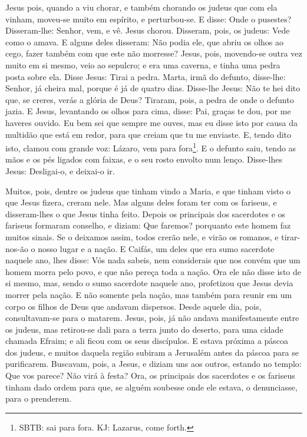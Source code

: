 Jesus pois, quando a viu chorar, e também chorando os judeus que
com ela vinham, moveu-se muito em espírito, e perturbou-se. E
disse: Onde o pusestes? Disseram-lhe: Senhor, vem, e vê.
Jesus chorou. Disseram, pois, os judeus: Vede como o
amava. E alguns deles disseram: Não podia ele, que abriu os
olhos ao cego, fazer também com que este não morresse? Jesus,
pois, movendo-se outra vez muito em si mesmo, veio ao sepulcro; e
era uma caverna, e tinha uma pedra posta sobre ela. Disse
Jesus: Tirai a pedra. Marta, irmã do defunto, disse-lhe: Senhor, já
cheira mal, porque é já de quatro dias. Disse-lhe Jesus: Não
te hei dito que, se creres, verás a glória de Deus? Tiraram,
pois, a pedra de onde o defunto jazia. E Jesus, levantando os olhos
para cima, disse: Pai, graças te dou, por me haveres ouvido.
Eu bem sei que sempre me ouves, mas eu disse isto por causa
da multidão que está em redor, para que creiam que tu me enviaste.
E, tendo dito isto, clamou com grande voz: Lázaro, vem para
fora\footnote{SBTB: sai para fora. KJ: Lazarus, come forth.}.
E o defunto saiu, tendo as mãos e os pés ligados com faixas,
e o seu rosto envolto num lenço. Disse-lhes Jesus: Desligai-o, e
deixai-o ir.

Muitos, pois, dentre os judeus que tinham vindo a Maria, e que
tinham visto o que Jesus fizera, creram nele. Mas alguns
deles foram ter com os fariseus, e disseram-lhes o que Jesus tinha
feito. Depois os principais dos sacerdotes e os fariseus
formaram conselho, e diziam: Que faremos? porquanto este homem faz
muitos sinais. Se o deixamos assim, todos crerão nele, e
virão os romanos, e tirar-nos-ão o nosso lugar e a nação. E
Caifás, um deles que era sumo sacerdote naquele ano, lhes disse: Vós
nada sabeis, nem considerais que nos convém que um homem
morra pelo povo, e que não pereça toda a nação. Ora ele não
disse isto de si mesmo, mas, sendo o sumo sacerdote naquele ano,
profetizou que Jesus devia morrer pela nação. E não somente
pela nação, mas também para reunir em um corpo os filhos de Deus que
andavam dispersos. Desde aquele dia, pois, consultavam-se
para o matarem. Jesus, pois, já não andava manifestamente
entre os judeus, mas retirou-se dali para a terra junto do deserto,
para uma cidade chamada Efraim; e ali ficou com os seus discípulos.
E estava próxima a páscoa dos judeus, e muitos daquela região
subiram a Jerusalém antes da páscoa para se purificarem.
Buscavam, pois, a Jesus, e diziam uns aos outros, estando no
templo: Que vos parece? Não virá à festa? Ora, os principais
dos sacerdotes e os fariseus tinham dado ordem para que, se alguém
soubesse onde ele estava, o denunciasse, para o prenderem.

